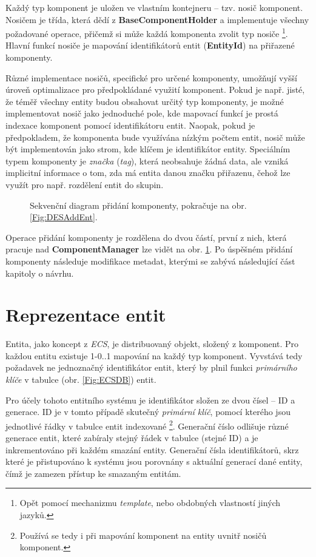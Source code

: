 Každý typ komponent je uložen ve vlastním kontejneru -- tzv. nosič komponent. Nosičem je třída, která dědí z \textbf{BaseComponentHolder} a implementuje všechny požadované operace, přičemž si může každá komponenta zvolit typ nosiče \footnote{Opět pomocí mechanizmu \emph{template}, nebo obdobných vlastností jiných jazyků.}. Hlavní funkcí nosiče je mapování identifikátorů entit (\textbf{EntityId}) na přiřazené komponenty. 

Různé implementace nosičů, specifické pro určené komponenty, umožňují vyšší úroveň optimalizace pro předpokládané využití komponent. Pokud je např. jisté, že téměř všechny entity budou obsahovat určitý typ komponenty, je možné implementovat nosič jako jednoduché pole, kde mapovací funkcí je prostá indexace komponent pomocí identifikátoru entit. Naopak, pokud je předpokladem, že komponenta bude využívána nízkým počtem entit, nosič může být implementován jako strom, kde klíčem je identifikátor entity. Speciálním typem komponenty je \emph{značka} (\emph{tag}), která neobsahuje žádná data, ale vzniká implicitní informace o tom, zda má entita danou značku přiřazenu, čehož lze využít pro např. rozdělení entit do skupin.

\begin{figure}[H]
	\caption{Sekvenční diagram přidání komponenty, pokračuje na obr. \ref{Fig:DESAddEnt}.}
	\label{Fig:DESAddComp}
\end{figure}

Operace přidání komponenty je rozdělena do dvou částí, první z nich, která pracuje nad \textbf{ComponentManager} lze vidět na obr. \ref{Fig:DESAddComp}. Po úspěšném přidání komponenty následuje modifikace metadat, kterými se zabývá následující část kapitoly o návrhu.

\section{Reprezentace entit}

Entita, jako koncept z \emph{ECS}, je distribuovaný objekt, složený z komponent. Pro každou entitu existuje 1-0..1 mapování na každý typ komponent. Vyvstává tedy požadavek ne jednoznačný identifikátor entit, který by plnil funkci \emph{primárního klíče} v tabulce (obr. \ref{Fig:ECSDB}) entit.

Pro účely tohoto entitního systému je identifikátor složen ze dvou čísel -- ID a generace. ID je v tomto případě skutečný \emph{primární klíč}, pomocí kterého jsou jednotlivé řádky v tabulce entit indexované \footnote{Používá se tedy i při mapování komponent na entity uvnitř nosičů komponent.}. Generační číslo odlišuje různé generace entit, které zabíraly stejný řádek v tabulce (stejné ID) a je inkrementováno při každém smazání entity. Generační čísla identifikátorů, skrz které je přistupováno k systému jsou porovnány s aktuální generací dané entity, čímž je zamezen přístup ke smazaným entitám.

